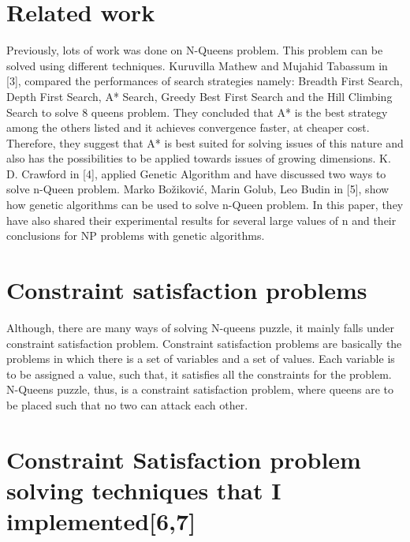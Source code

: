 \documentclass[conference]{IEEEtran}
\begin{document}
 




\section{Related work}
Previously,  lots  of  work  was done  on  N-Queens  problem. This problem can be solved using different techniques. Kuruvilla Mathew and Mujahid Tabassum in [3], compared the performances of search strategies namely: Breadth  First  Search,  Depth First Search, A* Search, Greedy Best First Search and the  Hill  Climbing  Search to solve 8 queens problem. They concluded that A* is the best strategy among the others listed and it achieves convergence faster, at cheaper cost. Therefore, they suggest that A* is  best  suited  for  solving  issues  of  this  nature and also  has  the possibilities  to  be  applied  towards  issues  of  growing dimensions.	 K.  D. Crawford  in  [4],  applied  Genetic  Algorithm  and  have discussed  two  ways  to  solve  n-Queen  problem. Marko Božiković, Marin Golub, Leo Budin in [5], show how genetic  algorithms can  be  used  to  solve  n-Queen  problem. In this paper, they have also shared their experimental results for several large values of n and their conclusions for NP problems with genetic algorithms.

\section{Constraint satisfaction problems}

Although, there are many ways of solving N-queens puzzle, it mainly falls under constraint satisfaction  problem. Constraint satisfaction problems are basically the problems in which there is a set of variables and a set of values. Each variable is to be assigned a value, such that, it satisfies all the constraints for the problem. N-Queens puzzle, thus, is a constraint satisfaction problem, where queens are to be placed such that no two can attack each other.

\section{Constraint Satisfaction problem solving techniques that I implemented[6,7]}
\end{document}
